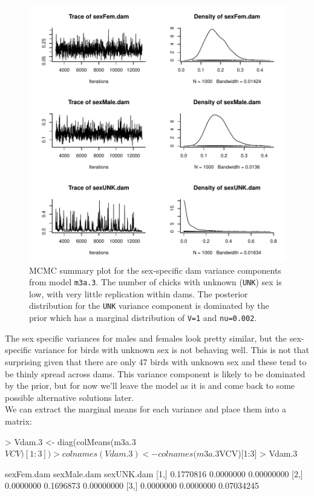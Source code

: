 \documentclass{article}
\begin{document}
\begin{figure}[!h]
\begin{center}
\includegraphics{Lecture3-019}
\end{center}
\caption{MCMC summary plot for the sex-specific dam variance components from model \texttt{m3a.3}. The number of chicks with unknown (\texttt{UNK}) sex is low, with very little replication within dams. The posterior distribution for the \texttt{UNK} variance component is dominated by the prior which has a marginal distribution of \texttt{V=1} and \texttt{nu=0.002}.}
\label{BTidh-fig}
\end{figure}

The sex specific variances for males and females look pretty similar, but the sex-specific variance for birds with unknown sex is not behaving well. This is not that surprising given that there are only 47 birds with unknown sex and these tend to be thinly spread across dams. This variance component is likely to be dominated by the prior, but for now we'll leave the model as it is and come back to some possible alternative solutions later.\\

We can extract the marginal means for each variance and place them into a matrix:

\begin{Schunk}
\begin{Sinput}
> Vdam.3 <- diag(colMeans(m3a.3$VCV)[1:3])
> colnames(Vdam.3) <- colnames(m3a.3$VCV)[1:3]
> Vdam.3
\end{Sinput}
\begin{Soutput}
     sexFem.dam sexMale.dam sexUNK.dam
[1,]  0.1770816   0.0000000 0.00000000
[2,]  0.0000000   0.1696873 0.00000000
[3,]  0.0000000   0.0000000 0.07034245
\end{Soutput}
\end{Schunk}
\end{document}

